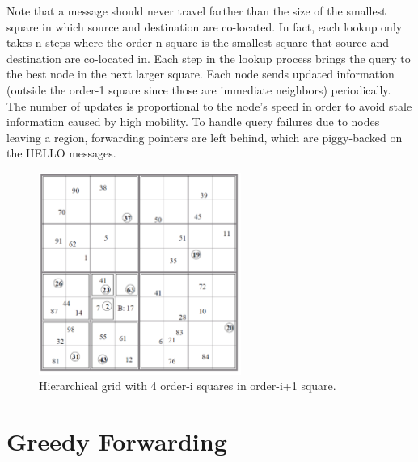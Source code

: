 \documentclass[conference]{IEEEtran}
\newcommand{\colwidth}{2.6in}
\begin{document}
Note that a message should never travel farther than the size of the smallest square in which source and destination are co-located.
In fact, each lookup only takes n steps where the order-n square is the smallest square that source and destination are co-located in.   
Each step in the lookup process brings the query to the best node in the next larger square.          
Each node sends updated information (outside the order-1 square since those are immediate neighbors) periodically.
The number of updates is proportional to the node's speed in order to avoid stale information caused by high mobility.
To handle query failures due to nodes leaving a region, forwarding pointers are left behind, which are piggy-backed on the HELLO messages.

\begin{figure}
\label{fig:location-service}
\centering
\includegraphics[width=\colwidth]{../../images/external/location_routing/location_service.pdf}
\caption{Hierarchical grid with 4 order-i squares in order-i+1 square.}
\end{figure}


\section{Greedy Forwarding}
\end{document}
